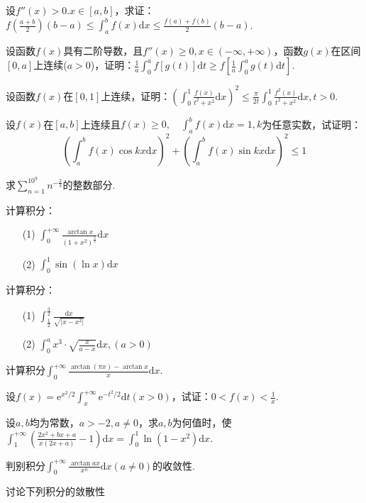 \begin{xiti}
\item 设$f''(x)>0.x\in [a,b]$，求证：$f\left(\frac{a+b}{2}\right)(b-a) \leqslant \int_{a}^{b} f(x) \mathrm{d} x \leqslant \frac{f(a)+f(b)}{2}(b-a)$.
\item 设函数$f(x)$具有二阶导数，且$f''(x)\geq 0,x\in (-\infty,+\infty)$，函数$g(x)$在区间$[0,a]$上连续($a>0$)，证明：$\frac{1}{a} \int_{0}^{a} f[g(t)] \mathrm{d} t \geqslant f\left[\frac{1}{a} \int_{0}^{a} g(t) \mathrm{d} t\right]$.
\item 设函数$f(x)$在$[0,1]$上连续，证明：$\left(\int_{0}^{1} \frac{f(x)}{t^{2}+x^{2}} \mathrm{d} x\right)^{2} \leqslant \frac{\pi}{2 t} \int_{0}^{1} \frac{f^{2}(x)}{t^{2}+x^{2}} \mathrm{d} x, t>0$.
\item 设$f(x)$在$[a,b]$上连续且$f(x) \geqslant 0, \quad \int_{a}^{b} f(x) \mathrm{d} x=1,k$为任意实数，试证明：
\[\left(\int_{a}^{b} f(x) \cos k x \mathrm{d}  x\right)^{2}+\left(\int_{a}^{b} f(x) \sin k x \mathrm{d}  x\right)^{2} \leqslant 1\]
\item 求$\sum_{n=1}^{10^{9}} n^{-\frac{2}{3}}$的整数部分.
\item 计算积分：
\begin{enumerate}
	\item [(1)]$\int_{0}^{+\infty} \frac{\arctan x}{\left(1+x^{2}\right)^{\frac{3}{2}}} \mathrm{d} x$
	\item [(2)]$\int_{0}^{1} \sin (\ln x) \mathrm{d} x$
\end{enumerate}
\item 计算积分：
\begin{enumerate}
	\item [(1)]$\int_{\frac{1}{2}}^{\frac{3}{2}} \frac{\mathrm{d} x}{\sqrt{\left|x-x^{2}\right|}}$
	\item [(2)]$\int_{0}^{a} x^{3} \cdot \sqrt{\frac{x}{a-x}} \mathrm{d} x,(a>0)$
\end{enumerate}
\item 计算积分$\int_{0}^{+\infty} \frac{\arctan (\pi x)-\arctan x}{x} \mathrm{d} x$.
\item 设$f(x)=\mathrm{e}^{x^{2} / 2} \int_{x}^{+\infty} \mathrm{e}^{-t^{2} / 2} \mathrm{d} t(x>0)$，试证：$0<f(x)<\frac{1}{x}$.
\item 设$a,b$均为常数，$a>-2,a\ne 0$，求$a,b$为何值时，使$\int_{1}^{+\infty}\left(\frac{2 x^{2}+b x+a}{x(2 x+a)}-1\right) \mathrm{d} x=\int_{0}^{1} \ln \left(1-x^{2}\right) \mathrm{d} x$.
\item 判别积分$\int_{0}^{+\infty} \frac{\arctan a x}{x^{n}} \mathrm{d} x(a \neq 0)$的收敛性.
\item 讨论下列积分的敛散性

\end{xiti}
